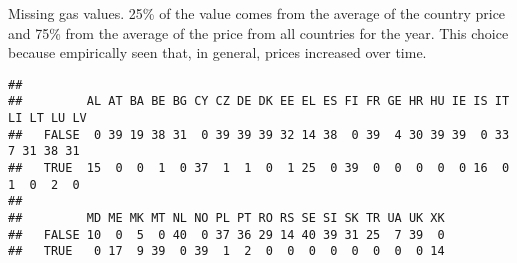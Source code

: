 \documentclass[
]{article}
\newenvironment{Shaded}{\begin{snugshade}}{\end{snugshade}}
\newcommand{\ControlFlowTok}[1]{\textcolor[rgb]{0.13,0.29,0.53}{\textbf{#1}}}
\newcommand{\DataTypeTok}[1]{\textcolor[rgb]{0.13,0.29,0.53}{#1}}
\newcommand{\DecValTok}[1]{\textcolor[rgb]{0.00,0.00,0.81}{#1}}
\newcommand{\FloatTok}[1]{\textcolor[rgb]{0.00,0.00,0.81}{#1}}
\newcommand{\KeywordTok}[1]{\textcolor[rgb]{0.13,0.29,0.53}{\textbf{#1}}}
\newcommand{\NormalTok}[1]{#1}
\newcommand{\OperatorTok}[1]{\textcolor[rgb]{0.81,0.36,0.00}{\textbf{#1}}}
\newcommand{\StringTok}[1]{\textcolor[rgb]{0.31,0.60,0.02}{#1}}
\begin{document}
Missing gas values. 25\% of the value comes from the average of the
country price and 75\% from the average of the price from all countries
for the year. This choice because empirically seen that, in general,
prices increased over time.

\begin{Shaded}
\end{Shaded}

\begin{verbatim}
##        
##         AL AT BA BE BG CY CZ DE DK EE EL ES FI FR GE HR HU IE IS IT LI LT LU LV
##   FALSE  0 39 19 38 31  0 39 39 39 32 14 38  0 39  4 30 39 39  0 33  7 31 38 31
##   TRUE  15  0  0  1  0 37  1  1  0  1 25  0 39  0  0  0  0  0 16  0  1  0  2  0
##        
##         MD ME MK MT NL NO PL PT RO RS SE SI SK TR UA UK XK
##   FALSE 10  0  5  0 40  0 37 36 29 14 40 39 31 25  7 39  0
##   TRUE   0 17  9 39  0 39  1  2  0  0  0  0  0  0  0  0 14
\end{verbatim}

\begin{Shaded}
\end{Shaded}
\end{document}
